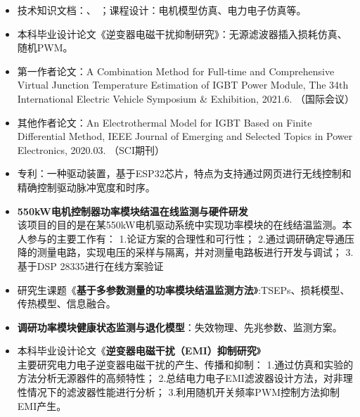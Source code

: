 \documentclass[zh]{resume}
\begin{document}
\begin{itemize}
  \item 技术知识文档：、
  ；课程设计：电机模型仿真、电力电子仿真等。
  \item 本科毕业设计论文《逆变器电磁干扰抑制研究》：无源滤波器插入损耗仿真、随机PWM。
  \item 第一作者论文：{\small A Combination Method for Full-time and Comprehensive Virtual Junction Temperature Estimation of IGBT Power Module, The 34th International Electric Vehicle Symposium \& Exhibition, 2021.6. （国际会议）}
  \item 其他作者论文：{\small An Electrothermal Model for IGBT Based on Finite Differential Method, IEEE Journal of Emerging and Selected Topics in Power Electronics, 2020.03. 
  （SCI期刊） }
  \item 专利：一种驱动装置，基于ESP32芯片，特点为支持通过网页进行无线控制和精确控制驱动脉冲宽度和时序。
\end{itemize}

\begin{itemize}
  \item \textbf{550kW电机控制器功率模块结温在线监测与硬件研发}\\
  {该项目的目的是在某550kW电机驱动系统中实现功率模块的在线结温监测。本人参与的主要工作有：
  1.论证方案的合理性和可行性；
  2.通过调研确定导通压降的测量电路，实现电压的采样与隔离，并对测量电路板进行开发与调试；
  3.基于DSP 28335进行在线方案验证}
  \item 研究生课题《\textbf{基于多参数测量的功率模块结温监测方法}》:TSEPs、损耗模型、传热模型、信息融合。
  \item \textbf{调研功率模块健康状态监测与退化模型}：失效物理、先兆参数、监测方案。
  \item 本科毕业设计论文《\textbf{逆变器电磁干扰（EMI）抑制研究}》\\ 
  {主要研究电力电子逆变器电磁干扰的产生、传播和抑制：
  1.通过仿真和实验的方法分析无源器件的高频特性；
  2.总结电力电子EMI滤波器设计方法，对非理性情况下的滤波器性能进行分析；
  3.利用随机开关频率PWM控制方法抑制EMI产生。}
\end{itemize}
\end{document}
